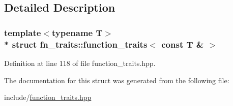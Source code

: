 \subsection{Detailed Description}
\subsubsection*{template$<$typename T$>$\\*
struct fn\+\_\+traits\+::function\+\_\+traits$<$ const T \& $>$}



Definition at line 118 of file function\+\_\+traits.\+hpp.



The documentation for this struct was generated from the following file\+:\begin{DoxyCompactItemize}
\item 
include/\hyperlink{function__traits_8hpp}{function\+\_\+traits.\+hpp}\end{DoxyCompactItemize}
